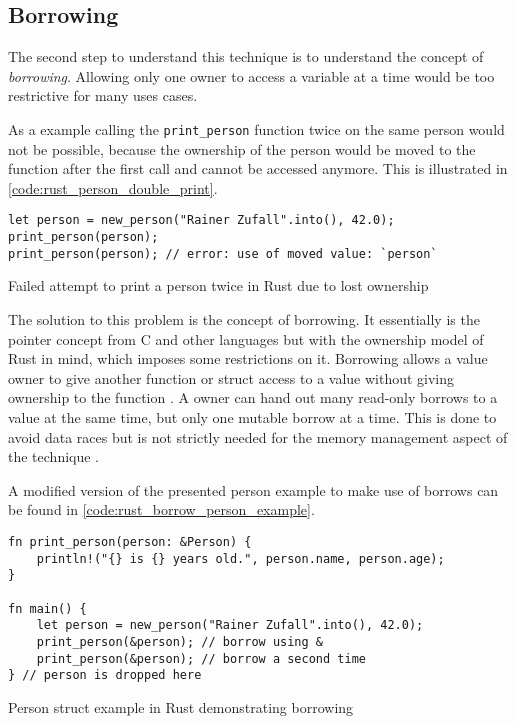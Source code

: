 \subsection{Borrowing}

The second step to understand this technique is to understand the concept of \textit{borrowing}.
Allowing only one owner to access a variable at a time would be too restrictive
for many uses cases.

As a example calling the \texttt{print\_person} function twice on the same person
would not be possible, because the ownership of the person would be moved to the
function after the first call and cannot be accessed anymore.
This is illustrated in \autoref{code:rust_person_double_print}.

\begin{listing}[H] 
    \begin{verbatim}
let person = new_person("Rainer Zufall".into(), 42.0);
print_person(person);
print_person(person); // error: use of moved value: `person`
    \end{verbatim}
    \caption{Failed attempt to print a person twice in Rust due to lost ownership}
    \label{code:rust_person_double_print}
\end{listing}

The solution to this problem is the concept of borrowing.
It essentially is the pointer concept from C and other languages but with
the ownership model of Rust in mind, which imposes some restrictions on it.
Borrowing allows a value owner to give another function or struct
access to a value without giving ownership to the function \cite[2.3 Borrowing]{rust_borrow_formalism_2021}.
A owner can hand out many read-only borrows to a value at the same time,
but only one mutable borrow at a time. This is done to avoid data races but
is not strictly needed for the memory management aspect of the technique \cite[90]{rust_book_2019}.

A modified version of the presented person example to make use of borrows
can be found in \autoref{code:rust_borrow_person_example}.

\begin{listing}[H] 
    \begin{verbatim}
fn print_person(person: &Person) {
    println!("{} is {} years old.", person.name, person.age);
}

fn main() {
    let person = new_person("Rainer Zufall".into(), 42.0);
    print_person(&person); // borrow using &
    print_person(&person); // borrow a second time
} // person is dropped here
    \end{verbatim}
    \caption{Person struct example in Rust demonstrating borrowing}
    \label{code:rust_borrow_person_example}
\end{listing}

